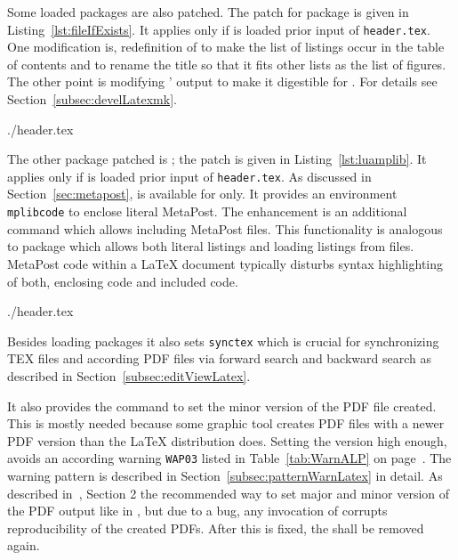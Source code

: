 Some loaded packages are also patched. 
The patch for package  is given in Listing~\ref{lst:fileIfExists}. 
It applies only if  is loaded prior input of \texttt{header.tex}. 
One modification is, redefinition of  
to make the list of listings occur in the table of contents 
and to rename the title so that it fits other lists as the list of figures.  
The other point is modifying ' output to make it digestible for . 
For details see Section~\ref{subsec:develLatexmk}. 

%
{./header.tex}%


The other package patched is ; the patch is given in Listing~\ref{lst:luamplib}. 
It applies only if  is loaded prior input of \texttt{header.tex}. 
As discussed in Section~\ref{sec:metapost}, 
 is available for \lualatex{} only. 
It provides an environment \texttt{mplibcode} to enclose literal MetaPost. 
The enhancement is an additional command  
which allows including MetaPost files. 
This functionality is analogous to package  
which allows both literal listings and loading listings from files. 
MetaPost code within a \LaTeX{} document typically disturbs syntax highlighting 
of both, enclosing code and included code. 

%

{./header.tex}%

Besides loading packages it also sets \texttt{synctex} 
which is crucial for synchronizing TEX files and according PDF files 
via forward search and backward search 
as described in Section~\ref{subsec:editViewLatex}. 


It also provides the command  to set the minor version of the PDF file created. 
This is mostly needed because some graphic tool creates PDF files with a newer PDF version 
than the \LaTeX{} distribution does. 
Setting the version high enough, avoids an according warning \texttt{WAP03} 
listed in Table~\ref{tab:WarnALP} on page~\pageref{tab:WarnALP}. 
The warning pattern is described in Section~\ref{subsec:patternWarnLatex} in detail. 
As described in~\cite{DocMetaDataSuppCode}, Section 2 
the recommended way to set major and minor version of the PDF output 
like in , 
but due to a bug, any invocation of  corrupts reproducibility of the created PDFs. 
After this is fixed, the  shall be removed again. 

